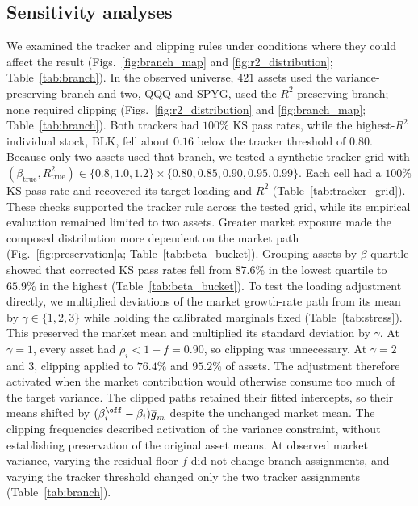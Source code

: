 
\subsection{Sensitivity analyses}

We examined the tracker and clipping rules under conditions where
they could affect the result (Figs.~\ref{fig:branch_map} and
\ref{fig:r2_distribution}; Table~\ref{tab:branch}). In the observed universe, $421$ assets
used the variance-preserving branch and two, QQQ and SPYG, used the
$R^2$-preserving branch; none required clipping
(Figs.~\ref{fig:r2_distribution} and \ref{fig:branch_map};
Table~\ref{tab:branch}). Both trackers had $100\%$ KS pass rates,
while the highest-$R^2$ individual stock, BLK, fell about $0.16$
below the tracker threshold of $0.80$. Because only two assets used
that branch, we tested a synthetic-tracker grid with
$(\beta_{\mathrm{true}},R^2_{\mathrm{true}})\in\{0.8,1.0,1.2\}
\times\{0.80,0.85,0.90,0.95,0.99\}$. Each cell had a $100\%$ KS pass
rate and recovered its target loading and $R^2$
(Table~\ref{tab:tracker_grid}). These checks supported the tracker
rule across the tested grid, while its empirical evaluation remained
limited to two assets.
Greater market exposure made the composed distribution more dependent
on the market path (Fig.~\ref{fig:preservation}a;
Table~\ref{tab:beta_bucket}). Grouping assets by $\beta$ quartile showed that
corrected KS pass rates fell from $87.6\%$ in the lowest quartile
to $65.9\%$ in the highest (Table~\ref{tab:beta_bucket}).
To test the loading adjustment directly, we multiplied deviations of
the market growth-rate path from its mean by
$\gamma\in\{1,2,3\}$ while holding the calibrated marginals fixed
(Table~\ref{tab:stress}). This preserved the market mean and multiplied
its standard deviation by $\gamma$. At $\gamma=1$, every
asset had $\rho_i<1-f=0.90$, so clipping was unnecessary.
At $\gamma=2$ and $3$, clipping applied to $76.4\%$ and $95.2\%$
of assets. The adjustment therefore activated when the market
contribution would otherwise consume too much of the target variance.
The clipped paths retained their fitted intercepts, so their means
shifted by $(\beta_i^{\eff}-\beta_i)\overline{g}_m$ despite the
unchanged market mean. The clipping frequencies described activation
of the variance constraint, without establishing preservation of the
original asset means. At observed market variance, varying the residual floor
$f$ did not change branch assignments, and varying the tracker
threshold changed only the two tracker assignments
(Table~\ref{tab:branch}).
